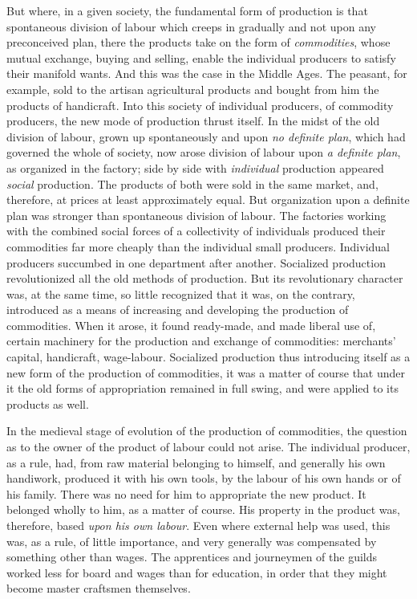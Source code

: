 But where, in a given society, the fundamental form of production is that
spontaneous division of labour which creeps in gradually and not upon any
preconceived plan, there the products take on the form of \emph{commodities},
whose mutual exchange, buying and selling, enable the individual producers to
satisfy their manifold wants. And this was the case in the Middle Ages. The
peasant, for example, sold to the artisan agricultural products and bought from
him the products of handicraft. Into this society of individual producers, of
commodity producers, the new mode of production thrust itself. In the midst of
the old division of labour, grown up spontaneously and upon \emph{no definite
plan}, which had governed the whole of society, now arose division of labour
upon \emph{a definite plan}, as organized in the factory; side by side with
\emph{individual} production appeared \emph{social} production. The products of
both were sold in the same market, and, therefore, at prices at least
approximately equal. But organization upon a definite plan was stronger than
spontaneous division of labour. The factories working with the combined social
forces of a collectivity of individuals produced their commodities far more
cheaply than the individual small producers. Individual producers succumbed
in one department after another. Socialized production revolutionized all the
old methods of production. But its revolutionary character was, at the same
time, so little recognized that it was, on the contrary, introduced as a means
of increasing and developing the production of commodities. When it arose, it
found ready-made, and made liberal use of, certain machinery for the production
and exchange of commodities: merchants' capital, handicraft, wage-labour.
Socialized production thus introducing itself as a new form of the production
of commodities, it was a matter of course that under it the old forms of
appropriation remained in full swing, and were applied to its products as well.

In the medieval stage of evolution of the production of commodities, the
question as to the owner of the product of labour could not arise. The
individual producer, as a rule, had, from raw material belonging to himself, and
generally his own handiwork, produced it with his own tools, by the labour of
his own hands or of his family. There was no need for him to appropriate the new
product. It belonged wholly to him, as a matter of course. His property in the
product was, therefore, based \emph{upon his own labour}. Even where external
help was used, this was, as a rule, of little importance, and very generally was
compensated by something other than wages. The apprentices and journeymen of the
guilds worked less for board and wages than for education, in order that they
might become master craftsmen themselves.

